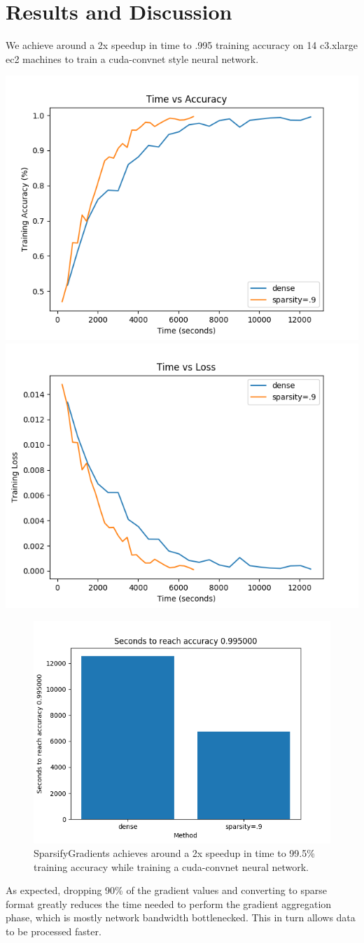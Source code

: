\documentclass[10pt]{article}
\begin{document}
\newpage

\section{Results and Discussion}
\label{sec-5}

We achieve around a 2x speedup in time to .995 training accuracy on 14
c3.xlarge ec2 machines to train a cuda-convnet style neural network.

\begin{center}
\includegraphics[height=0.35\textwidth]{./figures/SparsifyTimeVsAccuracy.png}
\includegraphics[height=0.35\textwidth]{./figures/SparsifyTimeVsLoss.png}
\end{center}
\begin{figure}[htb]
\centering
\includegraphics[height=0.35\textwidth]{./figures/SparsifyTimeUntilAccuracy.png}
\caption{SparsifyGradients achieves around a 2x speedup in time to 99.5\% training accuracy while training a cuda-convnet neural network.}
\end{figure}

\noindent
As expected, dropping 90\% of the gradient
values and converting to sparse format greatly reduces the time needed
to perform the gradient aggregation phase, which is mostly network
bandwidth bottlenecked. This in turn allows data to be processed faster.
\end{document}
